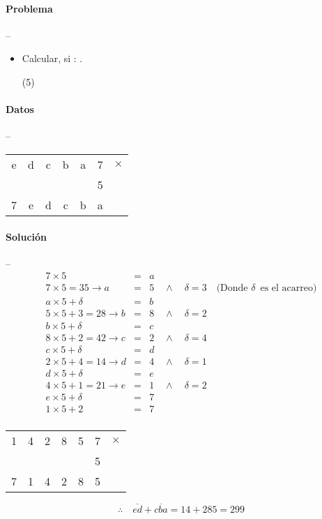 \documentclass[12pt, a4paper]{article}
\begin{document}
\paragraph*{Problema} -- \\
\begin{itemize}
	\item{Calcular\quad {}, si : .
	\begin{tasks}(5)
	\end{tasks}
	}
\end{itemize}
\paragraph*{Datos} -- \\

\begin{center}
	\begin{tabular}{ccccccc}
	e & d & c & b & a & 7 & $\times$ \\
	\empty & \empty & \empty & \empty & \empty & 5 & \empty \\ 
	\hline
	7 & e & d & c & b & a 
	\end{tabular}
\end{center}

\paragraph*{Solución} -- 
\begin{eqnarray*}
7 \times 5 &=& a \\
7 \times 5 = 35 \to a &=& 5\quad\wedge\quad\delta = 3\quad\text{(Donde } \delta\,\text{ es el acarreo)} \\
a \times 5 + \delta &=& b \\
5 \times 5 + 3 = 28 \to b &=& 8 \quad\wedge\quad\delta = 2\\
b \times 5 + \delta &=& c \\
8 \times 5 + 2 = 42 \to c &=& 2 \quad\wedge\quad\delta = 4\\
c \times 5 + \delta &=& d \\
2 \times 5 + 4 = 14 \to d &=& 4 \quad\wedge\quad\delta = 1\\
d \times 5 + \delta &=& e \\
4 \times 5 + 1 = 21 \to e &=& 1 \quad\wedge\quad\delta = 2\\
e \times 5 + \delta &=& 7 \\
1 \times 5 + 2 &=& 7 \\
\end{eqnarray*}

\begin{center}
	\begin{tabular}{ccccccc}
	1 & 4 & 2 & 8 & 5 & 7 & $\times$ \\
	\empty & \empty & \empty & \empty & \empty & 5 & \empty \\ 
	\hline
	7 & 1 & 4 & 2 & 8 & 5 
	\end{tabular}
\end{center}

$$
\therefore\quad \overline{ed} + \overline{cba} =  14 + 285 = 299
$$
\end{document}
